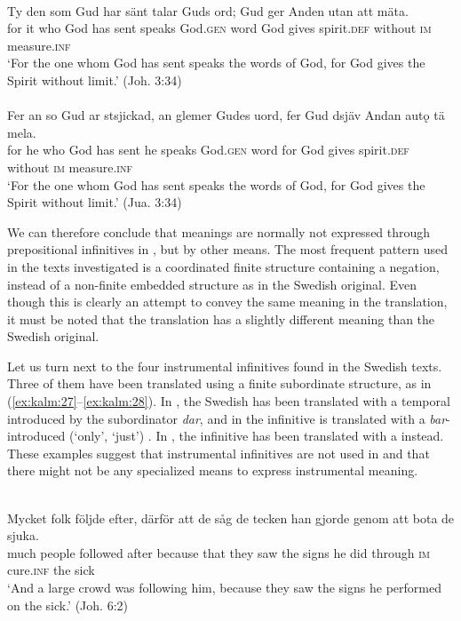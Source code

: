 \documentclass[output=paper]{langscibook}
\begin{document}
\ea
\label{ex:kalm:26}
\ea {}\label{ex:kalm:26a}\\
\gll Ty den som Gud har sänt talar Guds ord; Gud ger Anden utan att mäta.\\
for it who God has sent speaks God.\textsc{gen} word God gives spirit.\textsc{def} without \textsc{im} measure.\textsc{inf}\\
\glt ‘For the one whom God has sent speaks the words of God, for God gives the Spirit without limit.’ (Joh. 3:34)\\

\ex {}\label{ex:kalm:26b}\\
\gll Fer an so Gud ar stsjickad, an glemer Gudes uord, fer Gud dsjäv Andan autǫ tä mela.\\
for he who God has sent he speaks God.\textsc{gen} word for God gives spirit.\textsc{def} without \textsc{im} measure.\textsc{inf}\\
\glt ‘For the one whom God has sent speaks the words of God, for God gives the Spirit without limit.’ (Jua. 3:34)
\z
\z 


We can therefore conclude that  meanings are normally not expressed through prepositional infinitives in , but by other means. The most frequent pattern used in the texts investigated is a coordinated finite structure containing a negation, instead of a non-finite embedded structure as in the Swedish original. Even though this is clearly an attempt to convey the same meaning in the translation, it must be noted that the translation has a slightly different meaning than the Swedish original. 



Let us turn next to the four instrumental infinitives found in the Swedish texts. Three of them have been translated using a finite subordinate structure, as in (\ref{ex:kalm:27}–\ref{ex:kalm:28}). In , the Swedish  has been translated with a temporal  introduced by the subordinator \textit{dar}, and in  the infinitive is translated with a \textit{bar}-introduced (‘only’, ‘just’) . In , the infinitive has been translated with a  instead. These examples suggest that instrumental infinitives are not used in  and that there might not be any specialized means to express instrumental meaning. 


\ea
\label{ex:kalm:27}
\ea {}\label{ex:kalm:27a}\\
\gll Mycket folk följde efter, därför att de såg de tecken han gjorde genom att bota de sjuka.\\
 much people followed after because that they saw the signs he did through \textsc{im} cure.\textsc{inf} the sick\\
\glt ‘And a large crowd was following him, because they saw the signs he performed on the sick.’ (Joh. 6:2)\\
\end{document}
